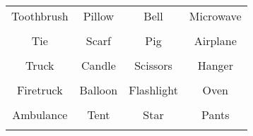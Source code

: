 \documentclass[12pt,a4paper]{article}
\begin{document}
\thispagestyle{empty}
\begin{table}[]
\centering
\Huge
\begin{tabular}{cccc}
 Toothbrush& Pillow& Bell& Microwave\\  & & & \\
 Tie& Scarf& Pig& Airplane\\  & & & \\
 Truck& Candle& Scissors& Hanger\\  & & & \\
 Firetruck& Balloon& Flashlight& Oven\\  & & & \\
 Ambulance& Tent& Star& Pants\\  & & & \\
\end{tabular}
\end{table}
\end{document}
